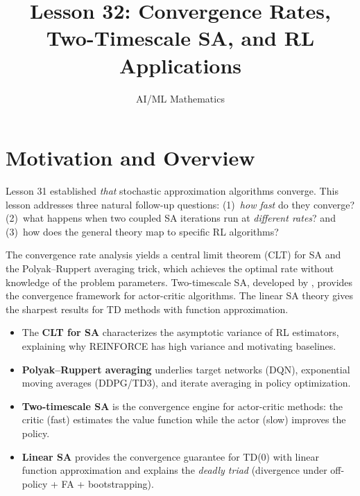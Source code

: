\documentclass[11pt,a4paper]{article}
\title{Lesson 32: Convergence Rates, Two-Timescale SA, and RL Applications}
\author{AI/ML Mathematics}
\date{}
\begin{document}
\maketitle
\tableofcontents
\newpage


\section{Motivation and Overview}
\label{sec:motivation}

Lesson 31 established \emph{that} stochastic approximation algorithms
converge. This lesson addresses three natural follow-up questions:
(1)~\emph{how fast} do they converge? (2)~what happens when two coupled
SA iterations run at \emph{different rates}? and (3)~how does the
general theory map to specific RL algorithms?

The convergence rate analysis yields a central limit theorem (CLT) for
SA and the Polyak--Ruppert averaging trick, which achieves the optimal
rate without knowledge of the problem parameters. Two-timescale SA,
developed by \citet{borkar1997}, provides the convergence framework for
actor-critic algorithms. The linear SA theory gives the sharpest
results for TD methods with function approximation.

\begin{rlconnection}[title={Why This Lesson Matters for RL}]
\begin{itemize}[nosep]
  \item The \textbf{CLT for SA} characterizes the asymptotic variance
    of RL estimators, explaining why REINFORCE has high variance and
    motivating baselines.
  \item \textbf{Polyak--Ruppert averaging} underlies target networks
    (DQN), exponential moving averages (DDPG/TD3), and iterate
    averaging in policy optimization.
  \item \textbf{Two-timescale SA} is the convergence engine for
    actor-critic methods: the critic (fast) estimates the value
    function while the actor (slow) improves the policy.
  \item \textbf{Linear SA} provides the convergence guarantee for
    TD(0) with linear function approximation and explains the
    \emph{deadly triad} (divergence under off-policy + FA +
    bootstrapping).
\end{itemize}
\end{rlconnection}
\end{document}
